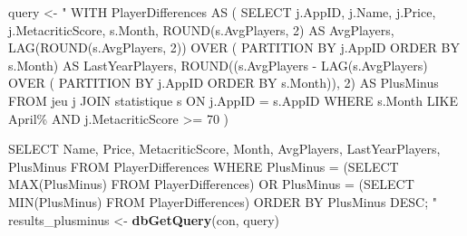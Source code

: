 \documentclass[mstat,12pt]{unswthesis}
\newenvironment{Shaded}{\begin{snugshade}}{\end{snugshade}}
\newcommand{\FunctionTok}[1]{\textcolor[rgb]{0.13,0.29,0.53}{\textbf{#1}}}
\newcommand{\NormalTok}[1]{#1}
\newcommand{\OtherTok}[1]{\textcolor[rgb]{0.56,0.35,0.01}{#1}}
\newcommand{\StringTok}[1]{\textcolor[rgb]{0.31,0.60,0.02}{#1}}
\begin{document}
\begin{Shaded}
\begin{Highlighting}[]
\NormalTok{query }\OtherTok{\textless{}{-}} \StringTok{"}
\StringTok{WITH PlayerDifferences AS (}
\StringTok{    SELECT }
\StringTok{        j.AppID,}
\StringTok{        j.Name,}
\StringTok{        j.Price,                  }
\StringTok{        j.MetacriticScore,         }
\StringTok{        s.Month,}
\StringTok{        ROUND(s.AvgPlayers, 2) AS AvgPlayers,}
\StringTok{        LAG(ROUND(s.AvgPlayers, 2)) OVER (}
\StringTok{        PARTITION BY j.AppID ORDER BY s.Month) AS LastYearPlayers,}
\StringTok{        ROUND((s.AvgPlayers {-} LAG(s.AvgPlayers) OVER (}
\StringTok{        PARTITION BY j.AppID ORDER BY s.Month)), 2) AS PlusMinus}
\StringTok{    FROM }
\StringTok{        jeu j}
\StringTok{    JOIN }
\StringTok{        statistique s ON j.AppID = s.AppID}
\StringTok{    WHERE }
\StringTok{        s.Month LIKE \textquotesingle{}April\%\textquotesingle{} AND}
\StringTok{        j.MetacriticScore \textgreater{}= 70  }
\StringTok{)}

\StringTok{SELECT }
\StringTok{    Name,}
\StringTok{    Price,                     }
\StringTok{    MetacriticScore,           }
\StringTok{    Month,}
\StringTok{    AvgPlayers,}
\StringTok{    LastYearPlayers,}
\StringTok{    PlusMinus}
\StringTok{FROM }
\StringTok{    PlayerDifferences}
\StringTok{WHERE }
\StringTok{    PlusMinus = (SELECT MAX(PlusMinus) FROM PlayerDifferences)}
\StringTok{    OR PlusMinus = (SELECT MIN(PlusMinus) FROM PlayerDifferences)}
\StringTok{ORDER BY }
\StringTok{    PlusMinus DESC;}
\StringTok{"}
\NormalTok{results\_plusminus }\OtherTok{\textless{}{-}} \FunctionTok{dbGetQuery}\NormalTok{(con, query)}
\end{Highlighting}
\end{Shaded}
\end{document}

